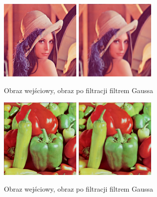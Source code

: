 \documentclass[final,a4paper,openany,12pt]{mwbk}
\begin{document}
\begin{figure}[H]
	\begin{center}
		\includegraphics[width=0.35\textwidth]{lena_color}
		\includegraphics[width=0.35\textwidth]{lena_color_lowpassGauss_result}
	\end{center}
	\caption{Obraz wejściowy, obraz po filtracji filtrem Gaussa}
\end{figure}

\begin{figure}[H]
	\begin{center}
		\includegraphics[width=0.35\textwidth]{peppers_color}
		\includegraphics[width=0.35\textwidth]{peppers_color_lowpassGauss_result}
	\end{center}
	\caption{Obraz wejściowy, obraz po filtracji filtrem Gaussa}
\end{figure}
\newpage
\end{document}

